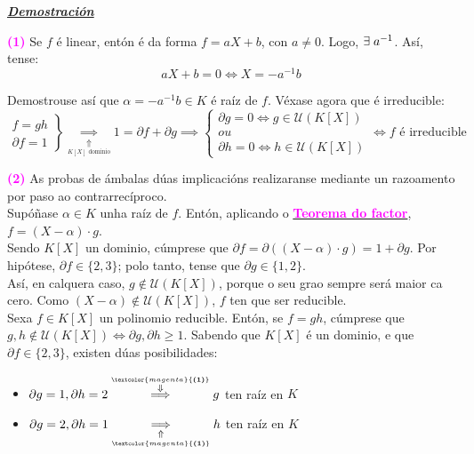 \documentclass[twoside]{report}
\newcommand{\magbf}[1]{\textcolor{magenta}{\textbf{#1}}} %
\theoremstyle{mystyle}
\begin{document}
\vspace{2mm}

\noindent \textbf{\textit{\underline{Demostración}}}

\vspace{2mm}

\noindent \magbf{(1)} Se $f$ é linear, entón é da forma $f = aX + b$, con $a \neq 0$. Logo, $\exists \hspace{1mm} a^{-1}$. Así, tense:
$$aX + b = 0 \Longleftrightarrow X = -a^{-1}b$$

\noindent Demostrouse así que $\alpha = -a^{-1}b \in K$ é raíz de $f$. Véxase agora que é irreducible:
    \[ 
    \left. \begin{array}{r} 
    f = gh  \\[1ex]
    \partial f = 1
    \end{array} \right\} 
    \underset{\underset{K[X] \text{ dominio}}{\Uparrow}}{\implies} 1 = \partial f + \partial g \implies
    \begin{cases}
    \partial g = 0 \Longleftrightarrow g \in \mathcal{U}(K[X])\\
    ou\\
    \partial h = 0 \Longleftrightarrow h \in \mathcal{U}(K[X])
    \end{cases}
    \Longleftrightarrow f \text{ é irreducible}
    \]
    
\vspace{2mm}

\noindent \magbf{(2)} As probas de ámbalas dúas implicacións realizaranse mediante un razoamento por paso ao contrarrecíproco.\\

\noindent {} Supóñase $\alpha \in K$ unha raíz de $f$. Entón, aplicando o \hyperref[cor2.6]{\magbf{Teorema do factor}}, $f = (X - \alpha) \cdot g $.\\

\noindent Sendo $K[X]$ un dominio, cúmprese que $\partial f = \partial ((X-\alpha) \cdot g) = 1 + \partial g$. Por hipótese, $\partial f \in \{2,3\}$; polo tanto, tense que $\partial g \in \{1,2\}$.\\

\noindent Así, en calquera caso, $g \notin \mathcal{U}(K[X])$, porque o seu grao sempre será maior ca cero. Como $(X - \alpha) \notin \mathcal{U}(K[X])$, $f$ ten que ser reducible.\\

\noindent {} Sexa $f \in K[X]$ un polinomio reducible. Entón, se $f = gh$, cúmprese que $g,h \notin \mathcal{U}(K[X]) \Longleftrightarrow \partial g, \partial h \geq 1$. Sabendo que $K[X]$ é un dominio, e que $\partial f \in \{2,3\}$, existen dúas posibilidades:
\begin{itemize}
    \item $\partial g = 1, \partial h = 2 \overset{\overset{\magbf{(1)}}{\Downarrow}}{\implies} g$ ten raíz en $K$
    \item $\partial g = 2, \partial h = 1 \underset{\underset{\magbf{(1)}}{\Uparrow}}{\implies} h$ ten raíz en $K$
\end{itemize}
\end{document}
